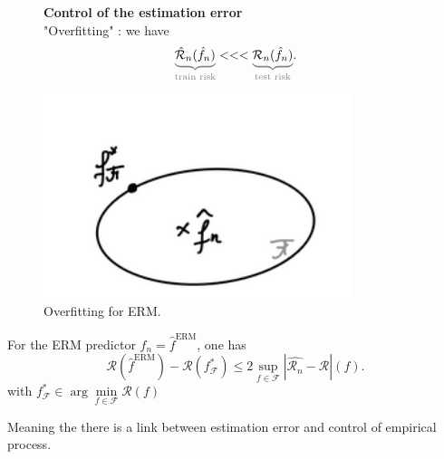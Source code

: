 
\begin{figure}[h]
    \begin{minipage}{0.5\textwidth}
        \textbf{Control of the estimation error} \\
        "Overfitting" : we have 
        \[
            \textcolor{gray}{\underbrace{\color{black} \hat{\mathcal{R}}_n (\hat{f}_n) }_{\text{train risk}  }}
            <<<
            \textcolor{gray}{\underbrace{\color{black} \mathcal{R}_n (\hat{f}_n) }_{\text{test risk}  }}
        .\]
    \end{minipage}
    \begin{minipage}{0.5\textwidth}
        \centering
        \includegraphics[width=0.8\textwidth]{figs/overfitting_ERM.png}
        \caption{Overfitting for ERM.}
    \end{minipage}
\end{figure}


\begin{lem}[]
    For the ERM predictor $\hat{f}_n = \hat{f}^{\text{ERM}}$, one has 
    \[
        \mathcal{R}(\hat{f}^{\text{ERM}}) - \mathcal{R}(f^\ast _{\mathcal{F}}) \leq 2 \sup_{f \in \mathcal{F}} \left| \hat{\mathcal{R}_n} - \mathcal{R} \right| (f)
    .\]
    with $f^\ast _{\mathcal{F}} \in \arg \min \limits_{f \in \mathcal{F}}\mathcal{R}(f)$
\end{lem}

Meaning the there is a link between estimation error and control of empirical process.

